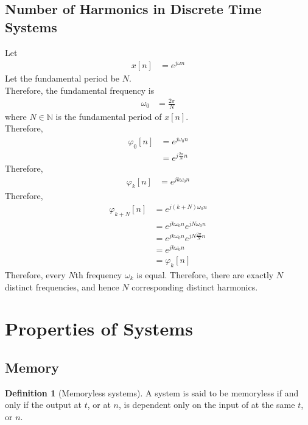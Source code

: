 \documentclass[titlepage, fleqn, a4paper, 12pt, twoside]{article}
\theoremstyle{definition}
\newtheorem{definition}{Definition}
\theoremstyle{theorem}
\begin{document}
\subsection{Number of Harmonics in Discrete Time Systems}

Let
\begin{align*}
	x[n] & = e^{j \omega n}
\end{align*}
Let the fundamental period be $N$.\\
Therefore, the fundamental frequency is
\begin{align*}
	\omega_0 & = \frac{2 \pi}{N}
\end{align*}
where $N \in \mathbb{N}$ is the fundamental period of $x[n]$.\\
Therefore,
\begin{align*}
	\varphi_0[n] & = e^{j \omega_0 n} \\
                     & = e^{j \frac{2 \pi}{N} n}
\end{align*}
Therefore,
\begin{align*}
	\varphi_k[n] & = e^{j k \omega_0 n}
\end{align*}
Therefore,
\begin{align*}
	\varphi_{k + N}[n] & = e^{j (k + N) \omega_0 n}                     \\
                           & = e^{j k \omega_0 n} e^{j N \omega_0 n}        \\
                           & = e^{j k \omega_0 n} e^{j N \frac{2 \pi}{N} n} \\
                           & = e^{j k \omega_0 n}                           \\
                           & = \varphi_k[n]
\end{align*}
Therefore, every $N$th frequency $\omega_k$ is equal.
Therefore, there are exactly $N$ distinct frequencies, and hence $N$ corresponding distinct harmonics.

\section{Properties of Systems}

\subsection{Memory}

\begin{definition}[Memoryless systems]
	A system is said to be memoryless if and only if the output at $t$, or at $n$, is dependent only on the input of at the same $t$, or $n$.
\end{definition}
\end{document}
